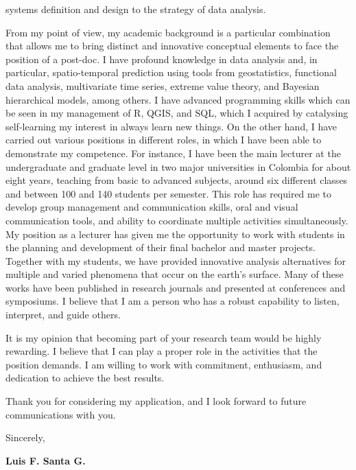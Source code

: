\documentclass[11pt, a4paper]{awesome-cv}
\begin{document}
\begin{cvletter}
systems definition and design to the strategy of data analysis.\par
From my point of view, my academic background is a particular combination that allows me to bring distinct and innovative conceptual elements to face the position of a post-doc. I have profound knowledge in data analysis and, in particular, spatio-temporal prediction using tools from geostatistics, functional data analysis, multivariate time series, extreme value theory, and  Bayesian hierarchical models, among others. I have advanced programming skills which can be seen in my management of R, QGIS, and SQL, which I acquired by catalysing self-learning my interest in always learn new things. On the other hand, I have carried out various positions in different roles, in which I have been able to demonstrate my competence. For instance, I have been the main lecturer at the undergraduate and graduate level in two major universities in Colombia for about eight years, teaching from basic to advanced subjects, around six different classes and between 100 and 140 students per semester. This role has required me to develop group management and communication skills, oral and visual communication tools, and ability to coordinate multiple activities simultaneously. My position as a lecturer has given me the opportunity to work with students in the planning and development of their final bachelor and master projects. Together with my students, we have provided innovative analysis alternatives for multiple and varied phenomena that occur on the earth's surface. Many of these works have been published in research journals and presented at conferences and symposiums. I believe that I am a person who has a robust capability to listen, interpret, and guide others. \par
It is my opinion that becoming part of your research team would be highly rewarding. I believe that I can play a proper role in the activities that the position demands. I am willing to work with commitment, enthusiasm, and dedication to achieve the best results.\par
Thank you for considering my application, and I look forward to future communications with you.\par
Sincerely,\par
{\bf Luis F. Santa G.}
\end{cvletter}


\end{document}
